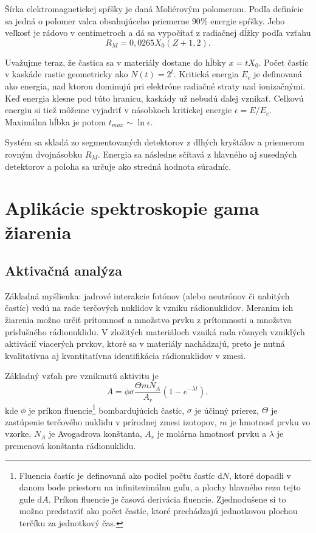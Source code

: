 \documentclass[../../main.tex]{subfiles}
\begin{document}
Šírka elektromagnetickej spŕšky je daná Moliérovým polomerom. Podľa definície sa jedná o polomer valca obsahujúceho priemerne $90\%$ energie spŕšky. Jeho veľkosť je rádovo v centimetroch a dá sa vypočítať z radiačnej dĺžky podľa vzťahu
\begin{equation}
R_M=0,0265X_0(Z+1,2).
\end{equation}

Uvažujme teraz, že častica sa v materiály dostane do hĺbky $x=tX_0$. Počet častíc v kaskáde rastie geometricky ako $N(t)=2^t$. Kritická energia $E_c$ je definovaná ako energia, nad ktorou dominujú pri elektróne radiačné straty nad ionizačnými. Keď energia klesne pod túto hranicu, kaskády už nebudú ďalej vznikať. Celkovú energiu si tiež môžeme vyjadriť v násobkoch kritickej energie $\epsilon=E/E_c$. Maximálna hĺbka je potom $t_{max}\sim \ln \epsilon$.

Systém sa skladá zo segmentovaných detektorov z dlhých kryštálov a priemerom rovným dvojnásobku $R_M$. Energia sa následne sčítavá z hlavného aj susedných detektorov a poloha sa určuje ako stredná hodnota súradníc.

\section{Aplikácie spektroskopie gama žiarenia}

\subsection{Aktivačná analýza}

Základná myšlienka: jadrové interakcie fotónov (alebo neutrónov či nabitých častíc) vedú na rade terčových nuklidov k vzniku rádionuklidov. Meraním ich žiarenia možno určiť prítomnosť a množstvo prvku z prítomnosti a množstva príslušného rádionuklidu. V zložitých materiáloch vzniká rada rôznych vzniklých aktivácií viacerých prvkov, ktoré sa v materiály nachádzajú, preto je nutná kvalitatívna aj kvantitatívna identifikácia rádionuklidov v zmesi.

Základný vzťah pre vzniknutú aktivitu je
\begin{equation}
A=\phi \sigma \dfrac{\Theta m N_A}{A_r} \left(1-e^{-\lambda t}\right),
\end{equation}
kde $\phi$ je príkon fluencie\footnote{Fluencia častíc je definovaná ako podiel počtu častíc d$N$, ktoré dopadli v danom bode priestoru na infinitezimálnu guľu, a plochy hlavného rezu tejto gule d$A$. Príkon fluencie je časová derivácia fluencie. Zjednodušene si to možno predstaviť ako počet častíc, ktoré prechádzajú jednotkovou plochou terčíku za jednotkový čas.} bombardujúcich častíc, $\sigma$ je účinný prierez, $\Theta$ je zastúpenie terčového nuklidu v prírodnej zmesi izotopov, $m$ je hmotnosť prvku vo vzorke, $N_A$ je Avogadrova konštanta, $A_r$ je molárna hmotnosť prvku a $\lambda$ je premenová konštanta rádionuklidu.
\end{document}
